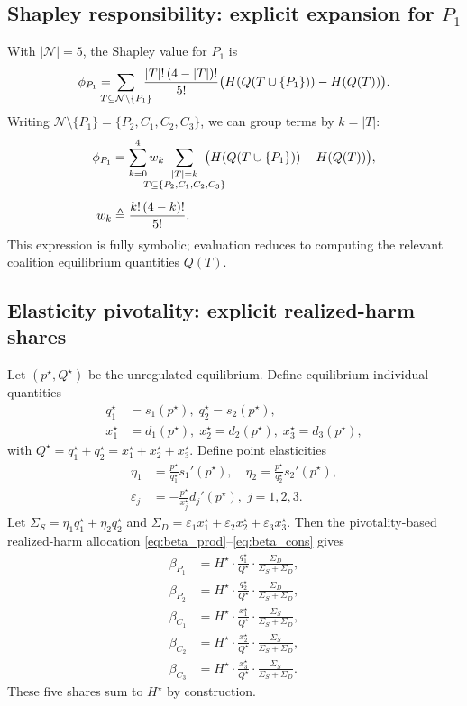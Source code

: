 \documentclass[journal, a4paper]{IEEEtran}
\begin{document}
\subsection{Shapley responsibility: explicit expansion for $P_1$}
With $|\mathcal{N}|=5$, the Shapley value for $P_1$ is
\begin{equation}
\phi_{P_1}
=\mspace{-20mu}
\sum_{T\subseteq \mathcal{N}\setminus\{P_1\}}\mspace{-15mu}
\frac{|T|!\,(4-|T|)!}{5!}\big(H(Q(T\cup\{P_1\}))-H(Q(T))\big).
\end{equation}
Writing $\mathcal{N}\setminus\{P_1\}=\{P_2,C_1,C_2,C_3\}$, we can group terms by $k=|T|$:
\begin{align}
\phi_{P_1}&=\sum_{k=0}^{4} w_k \mspace{-33mu} \sum_{\substack{|T|=k\\T\subseteq \{P_2,C_1,C_2,C_3\} }}\mspace{-33mu}
\big(H(Q(T\cup\{P_1\}))-H(Q(T))\big),\\[1ex]
w_k&\triangleq \frac{k!\,(4-k)!}{5!}.
\end{align}
This expression is fully symbolic; evaluation reduces to computing the relevant coalition equilibrium quantities $Q(T)$.

\subsection{Elasticity pivotality: explicit realized-harm shares}
Let $(p^\star,Q^\star)$ be the unregulated equilibrium. Define equilibrium individual quantities
\begin{align}
q_1^\star&=s_1(p^\star),\; q_2^\star=s_2(p^\star),\\
x_1^\star&=d_1(p^\star),\; x_2^\star=d_2(p^\star),\; x_3^\star=d_3(p^\star),
\end{align}
with $Q^\star=q_1^\star+q_2^\star=x_1^\star+x_2^\star+x_3^\star$.
Define point elasticities
\begin{align}
\eta_1&=\frac{p^\star}{q_1^\star}s_1'(p^\star),\quad
\eta_2=\frac{p^\star}{q_2^\star}s_2'(p^\star),\\
\varepsilon_j&=-\frac{p^\star}{x_j^\star}d_j'(p^\star),\; j=1,2,3.
\end{align}
Let $\Sigma_S=\eta_1 q_1^\star+\eta_2 q_2^\star$ and $\Sigma_D=\varepsilon_1 x_1^\star+\varepsilon_2 x_2^\star+\varepsilon_3 x_3^\star$.
Then the pivotality-based realized-harm allocation \eqref{eq:beta_prod}--\eqref{eq:beta_cons} gives
\begin{align}
\beta_{P_1} &= H^\star\cdot \frac{q_1^\star}{Q^\star}\cdot \frac{\Sigma_D}{\Sigma_S+\Sigma_D},\\
\beta_{P_2} &= H^\star\cdot \frac{q_2^\star}{Q^\star}\cdot \frac{\Sigma_D}{\Sigma_S+\Sigma_D},\\[2ex]
\beta_{C_1} &= H^\star\cdot \frac{x_1^\star}{Q^\star}\cdot \frac{\Sigma_S}{\Sigma_S+\Sigma_D},\\
\beta_{C_2} &= H^\star\cdot \frac{x_2^\star}{Q^\star}\cdot \frac{\Sigma_S}{\Sigma_S+\Sigma_D},\\
\beta_{C_3} &= H^\star\cdot \frac{x_3^\star}{Q^\star}\cdot \frac{\Sigma_S}{\Sigma_S+\Sigma_D}.
\end{align}
These five shares sum to $H^\star$ by construction.
\end{document}

